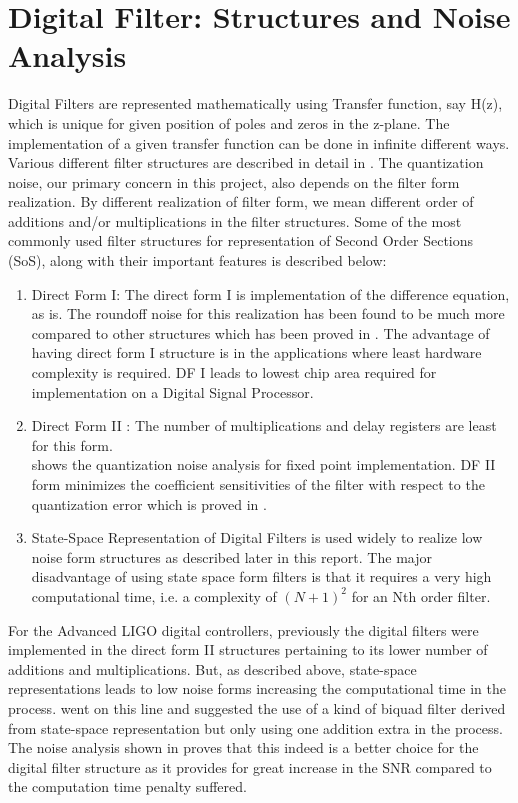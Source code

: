 \documentclass[colorlinks=true,pdfstartview=FitV,linkcolor=blue,
            citecolor=red,urlcolor=magenta]{ligodoc}
\begin{document}
\section{Digital Filter: Structures and Noise Analysis}
Digital Filters are represented mathematically using Transfer function, say H(z), which is unique for given position of poles and zeros in the z-plane. The implementation of a given transfer function can be done in infinite different ways. Various different filter structures are described in detail in \cite{Oppenheim}. The quantization noise, our primary concern in this project, also depends on the filter form realization. By different realization of filter form, we mean different order of additions and/or multiplications in the filter structures.
Some of the most commonly used filter structures for representation of Second Order Sections (SoS), along with their important features is described below:\\
\begin{enumerate}
\item Direct Form I: The direct form I is implementation of the difference equation, as is. The roundoff noise for this realization has been found to be much more compared to other structures which has been proved in \cite{Oppenheim}. The advantage of having direct form I structure is in the applications where least hardware complexity is required. DF I leads to lowest chip area required for implementation on a Digital Signal Processor. \cite{Hardware}\\
\item Direct Form II : The number of multiplications and delay registers are least for this form. \\
\cite{Oppenheim} shows the quantization noise analysis for fixed point implementation.
DF II form minimizes the coefficient sensitivities of the filter with respect to the quantization error which is proved in \cite{Hardware}.\\
\item State-Space Representation of Digital Filters is used widely to realize low noise form structures as described later in this report. The major disadvantage of using state space form filters is that it requires a very high computational time, i.e. a complexity of $(N+1)^{2}$ for an Nth order filter.\cite{StateSpace}\\
\end{enumerate}
For the Advanced LIGO digital controllers, previously the digital filters were implemented in  the direct form II structures pertaining to its lower number of additions and multiplications.
But, as described above, state-space representations leads to low noise forms increasing the computational time in the process. \cite{Matts} went on this line and suggested the use of a kind of biquad filter derived from state-space representation but only using one addition extra in the process. The noise analysis shown in \cite{Matts} proves that this indeed is a better choice for the digital filter structure as it provides for great increase in the SNR compared to the computation time penalty suffered.
\end{document}
